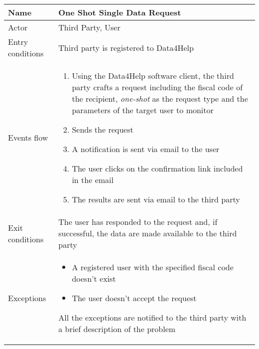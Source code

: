 \newpage

\begin{table}[h!]
    \begin{tabular}{|l|p{12cm}|}
        \hline
        Name             & One Shot Single Data Request \\ \hline
        Actor            & Third Party, User \\ \hline
        Entry conditions & Third party is registered to Data4Help \\ \hline
        Events flow      & 
        \begin{enumerate}
            \item Using the Data4Help software client, the third party crafts a request including the fiscal code of the recipient, \textit{one-shot} as the request type and the parameters of the target user to monitor
            \item Sends the request
            \item A notification is sent via email to the user
            \item The user clicks on the confirmation link included in the email
            \item The results are sent via email to the third party
        \end{enumerate} \\ \hline
        Exit conditions  & The user has responded to the request and, if successful, 
        the data are made available to the third party \\ \hline
        Exceptions & 
        \begin{itemize}
            \item A registered user with the specified fiscal code doesn't exist
            \item The user doesn't accept the request
        \end{itemize} All the exceptions are notified to the third party with a brief description of the problem \\ \hline
    \end{tabular}
\end{table}

\newpage


